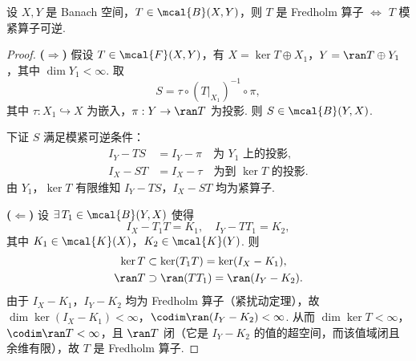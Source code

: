 \begin{theorem}\label{thm:fredholm-mod-compact}
设 $X,Y$ 是 Banach 空间，$T \in \mcal{B}(X,Y)$，则 $T$ 是 Fredholm 算子 $\iff$ $T$ 模紧算子可逆.
\end{theorem}

\begin{proof}
\textbf{($\Rightarrow$)} 假设 $T \in \mcal{F}(X,Y)$，有 $X = \ker T \oplus X_1$，$Y = \ran T \oplus Y_1$，其中 $\dim Y_1 < \infty$. 取
\begin{equation*}
S = \tau \circ (T|_{X_1})^{-1} \circ \pi,
\end{equation*}
其中 $\tau: X_1 \hookrightarrow X$ 为嵌入，$\pi: Y \to \ran T$ 为投影. 则 $S \in \mcal{B}(Y,X)$.\par
下证 $S$ 满足模紧可逆条件：
\begin{align*}
I_Y - TS &= I_Y - \pi \quad\text{为 $Y_1$ 上的投影},\\
I_X - ST &= I_X - \tau \quad\text{为到 $\ker T$ 的投影}.
\end{align*}
由 $Y_1$，$\ker T$ 有限维知 $I_Y-TS$，$I_X-ST$ 均为紧算子.\par
\textbf{($\Leftarrow$)} 设 $\exists\, T_1 \in \mcal{B}(Y,X)$ 使得
\begin{equation*}
I_X - T_1T = K_1,\quad I_Y - TT_1 = K_2,
\end{equation*}
其中 $K_1 \in \mcal{K}(X)$，$K_2 \in \mcal{K}(Y)$. 则
\begin{align*}
\ker T &\subset \ker(T_1T) = \ker(I_X-K_1),\\
\ran T &\supset \ran(TT_1) = \ran(I_Y-K_2).
\end{align*}
由于 $I_X-K_1$，$I_Y-K_2$ 均为 Fredholm 算子（紧扰动定理），故 $\dim\ker(I_X-K_1) < \infty$，$\codim\ran(I_Y-K_2) < \infty$. 从而 $\dim\ker T < \infty$，$\codim\ran T < \infty$，且 $\ran T$ 闭（它是 $I_Y-K_2$ 的值的超空间，而该值域闭且余维有限），故 $T$ 是 Fredholm 算子.
\end{proof}


